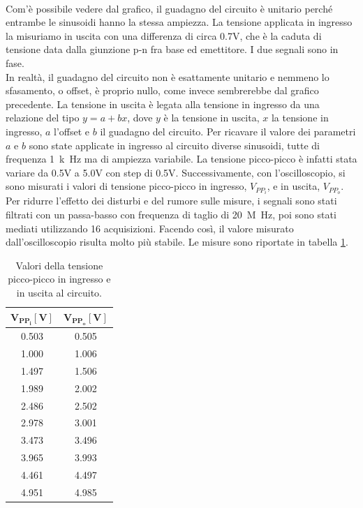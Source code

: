 \documentclass{report}
\begin{document}
\\
Com'è possibile vedere dal grafico, il guadagno del circuito è unitario perché entrambe le sinusoidi hanno la stessa ampiezza. La tensione applicata in ingresso la misuriamo in uscita con una differenza di circa 0.7V, che è la caduta di tensione data dalla giunzione p-n fra base ed emettitore. I due segnali sono in fase. 
\\\indent In realtà, il guadagno del circuito non è esattamente unitario e nemmeno lo sfasamento, o offset, è proprio nullo, come invece sembrerebbe dal grafico precedente. La tensione in uscita è legata alla tensione in ingresso da una relazione del tipo $y=a+bx$, dove $y$ è la tensione in uscita, $x$ la tensione in ingresso, $a$ l'offset e $b$ il guadagno del circuito. Per ricavare il valore dei parametri $a$ e $b$ sono state applicate in ingresso al circuito diverse sinusoidi, tutte di frequenza \SI {1}{k\hertz} ma di ampiezza variabile. La tensione picco-picco è infatti stata variare da 0.5V a 5.0V con step di 0.5V. Successivamente, con l'oscilloscopio, si sono misurati i valori di tensione picco-picco in ingresso, $V_{PP_i}$, e in uscita, $V_{PP_o}$. 
\\\indent Per ridurre l'effetto dei disturbi e del rumore sulle misure, i segnali sono stati filtrati con un passa-basso con frequenza di taglio di \SI{20}{M\hertz}, poi sono stati mediati utilizzando 16 acquisizioni. Facendo così, il valore misurato dall'oscilloscopio risulta molto più stabile. Le misure sono riportate in tabella \ref{table:tabgrafico}.
\begin{table}[h]
	\centering
	\begin{tabular}{|c|c|}
		\hline
		$\mathbf{V_{PP_i}[V]}$ & $\mathbf{V_{PP_o}[V]}$\\ 
		\hline
		0.503 & 0.505 \\
		\hline
		1.000 & 1.006 \\
		\hline
		1.497 & 1.506 \\
		\hline
		1.989 & 2.002 \\
		\hline
		2.486 & 2.502 \\
		\hline
		2.978 & 3.001 \\
		\hline
		3.473 & 3.496 \\
		\hline
		3.965 & 3.993 \\
		\hline
		4.461 & 4.497 \\
		\hline
		4.951 & 4.985 \\
		\hline
	\end{tabular}
\caption{Valori della tensione picco-picco in ingresso e in uscita al circuito.}
\label{table:tabgrafico}
\end{table}
\end{document}
